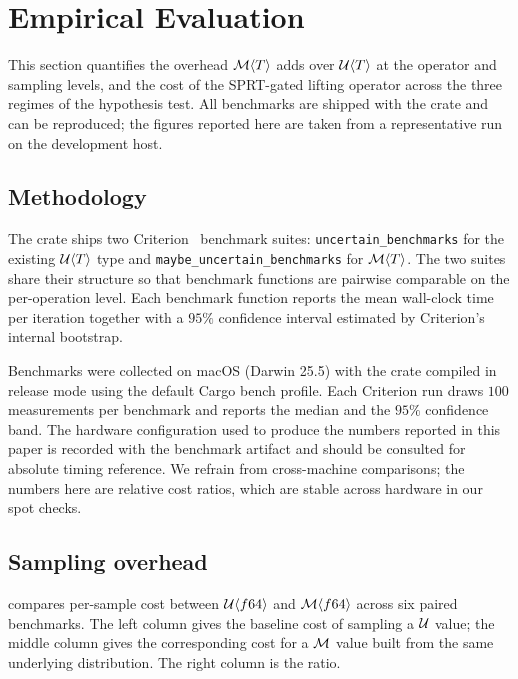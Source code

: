 \section{Empirical Evaluation}
\label{sec:evaluation}

This section quantifies the overhead $\mathcal{M}\langle T \rangle$ adds over
$\mathcal{U}\langle T \rangle$ at the operator and sampling levels, and the cost
of the SPRT-gated lifting operator across the three regimes of the
hypothesis test. All benchmarks are shipped with the crate and can be
reproduced; the figures reported here are taken from a representative run
on the development host.

\subsection{Methodology}
\label{sec:eval:methodology}

The crate ships two Criterion~\cite{criterion} benchmark suites:
\texttt{uncertain\_benchmarks} for the existing $\mathcal{U}\langle T \rangle$
type and \texttt{maybe\_uncertain\_benchmarks} for
$\mathcal{M}\langle T \rangle$. The two suites share their structure so that
benchmark functions are pairwise comparable on the per-operation level.
Each benchmark function reports the mean wall-clock time per iteration
together with a $95\%$ confidence interval estimated by Criterion's
internal bootstrap.

Benchmarks were collected on macOS (Darwin 25.5) with the crate compiled
in release mode using the default Cargo bench profile. Each Criterion run
draws $100$ measurements per benchmark and reports the median and the $95\%$
confidence band. The hardware configuration used to produce the numbers
reported in this paper is recorded with the benchmark artifact and should
be consulted for absolute timing reference. We refrain from cross-machine
comparisons; the numbers here are relative cost ratios, which are stable
across hardware in our spot checks.

\subsection{Sampling overhead}
\label{sec:eval:sampling}

 compares per-sample cost between $\mathcal{U}\langle f64
\rangle$ and $\mathcal{M}\langle f64 \rangle$ across six paired benchmarks. The
left column gives the baseline cost of sampling a $\mathcal{U}$ value; the
middle column gives the corresponding cost for a $\mathcal{M}$ value built from
the same underlying distribution. The right column is the ratio.

